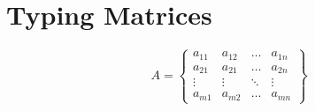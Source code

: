 \documentclass{article}
\begin{document}
	
\section{Typing Matrices}

\begin{equation}
	A =\left\{ \begin{matrix}
	a_{11} & a_{12} & \dots & a_{1n} \\
	a_{21} & a_{21} & \dots & a_{2n} \\
	\vdots & \vdots & \ddots & \vdots \\
	a_{m1} & a_{m2} & \dots & a_{mn}
	\end{matrix}\right\}
\end{equation}
\end{document}
